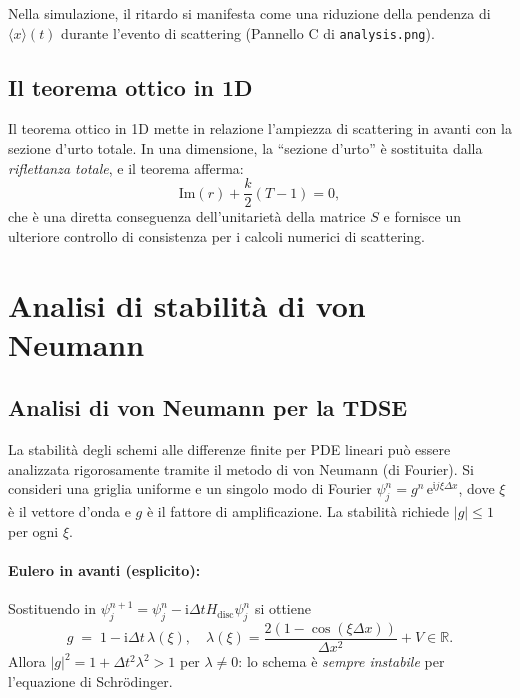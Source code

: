 \documentclass[12pt, a4paper]{article}
\newcommand{\dt}{\Delta t}
\newcommand{\dx}{\Delta x}
\newcommand{\ii}{\mathrm{i}}          %
\newcommand{\ee}{\mathrm{e}}          %
\begin{document}
Nella simulazione, il ritardo si manifesta come una riduzione della pendenza
di $\langle x\rangle(t)$ durante l'evento di scattering (Pannello C di
\texttt{analysis.png}).

\subsection{Il teorema ottico in 1D}

Il teorema ottico in 1D mette in relazione l'ampiezza di scattering in
avanti con la sezione d'urto totale. In una dimensione, la ``sezione
d'urto'' è sostituita dalla \emph{riflettanza totale}, e il teorema afferma:
\begin{equation}
  \mathrm{Im}(r) + \frac{k}{2}(T-1) = 0,
\end{equation}
che è una diretta conseguenza dell'unitarietà della matrice $S$ e fornisce
un ulteriore controllo di consistenza per i calcoli numerici di scattering.

\section{Analisi di stabilità di von Neumann}
\label{app:stability}

\subsection{Analisi di von Neumann per la TDSE}

La stabilità degli schemi alle differenze finite per PDE lineari può essere
analizzata rigorosamente tramite il metodo di von Neumann (di Fourier).
Si consideri una griglia uniforme e un singolo modo di Fourier
$\psi_j^n = g^n\,\ee^{\ii j\xi\dx}$, dove $\xi$ è il vettore d'onda e
$g$ è il fattore di amplificazione. La stabilità richiede $|g| \leq 1$
per ogni $\xi$.

\paragraph{Eulero in avanti (esplicito):}
Sostituendo in $\psi_j^{n+1} = \psi_j^n - \ii\dt H_\text{disc}\psi_j^n$
si ottiene
\begin{equation}
  g \;=\; 1 - \ii\dt\,\lambda(\xi),
  \quad \lambda(\xi) = \frac{2(1-\cos(\xi\dx))}{\dx^2} + V \in \mathbb{R}.
\end{equation}
Allora $|g|^2 = 1 + \dt^2\lambda^2 > 1$ per $\lambda \neq 0$: lo schema
è \emph{sempre instabile} per l'equazione di Schrödinger.
\end{document}

